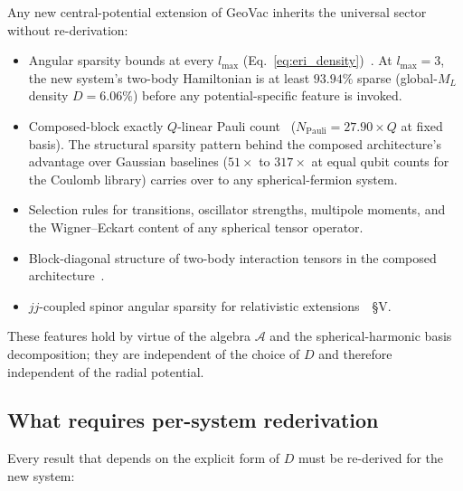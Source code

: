 \documentclass[twocolumn,pra,amsmath,amssymb,superscriptaddress]{revtex4-2}
\begin{document}
Any new central-potential extension of GeoVac inherits the universal
sector without re-derivation:

\begin{itemize}
\item Angular sparsity bounds at every $l_{\max}$
  (Eq.~\eqref{eq:eri_density})~\cite{paper22}.  At $l_{\max} = 3$,
  the new system's two-body Hamiltonian is at least $93.94\%$
  sparse (global-$M_L$ density $D = 6.06\%$) before any
  potential-specific feature is invoked.
\item Composed-block exactly $Q$-linear Pauli
  count~\cite{paper14} ($N_{\mathrm{Pauli}} = 27.90 \times Q$ at
  fixed basis).  The structural sparsity pattern behind the composed
  architecture's advantage over Gaussian baselines ($51\times$ to
  $317\times$ at equal qubit counts for the Coulomb library) carries
  over to any spherical-fermion system.
\item Selection rules for transitions, oscillator strengths,
  multipole moments, and the Wigner--Eckart content of any
  spherical tensor operator.
\item Block-diagonal structure of two-body interaction tensors in
  the composed architecture~\cite{paper17}.
\item $jj$-coupled spinor angular sparsity for relativistic
  extensions~\cite{paper14}~\S V.
\end{itemize}

These features hold by virtue of the algebra $\mathcal{A}$ and the
spherical-harmonic basis decomposition; they are independent of the
choice of $D$ and therefore independent of the radial potential.

\subsection{What requires per-system rederivation}

Every result that depends on the explicit form of $D$ must be
re-derived for the new system:
\end{document}
